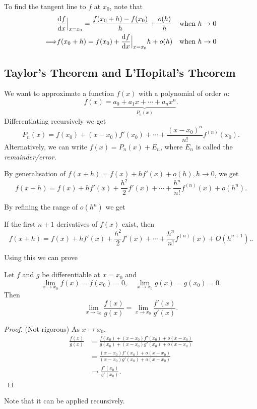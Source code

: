 \documentclass[10pt]{article}
\begin{document}
    To find the tangent line to $f$ at $x_0$, note that 
    \[
        \begin{aligned}
             & \frac{\mathrm{d}f}{\mathrm{d}x}\Big|_{x=x_0} = \frac{f(x_0+h)-f(x_0)}{h}+ \frac{o(h)}{h} & \text{when $ h \to 0$} \\
             \Longrightarrow & f(x_0+h) = f(x_0)+\frac{\mathrm{d}f}{\mathrm{d}x}\Big|_{x=x_0} h + o(h)& \text{when $ h \to 0$} \\
        \end{aligned}
    \]
    \subsection{Taylor's Theorem and L'Hopital's Theorem}
    We want to approximate a function $f(x)$ with a polynomial of order $n$:
    \[
        f(x) = \underbrace{a_0+a_1x+\cdots+a_nx^n}_{P_n(x)}
    .\]
    Differentiating recursively we get 
    \begin{equation}\label{eq:taylor_series}
        P_n(x) = f(x_0)+(x-x_0)f'(x_0)+\cdots+\frac{(x-x_0)^n}{n!}f^{(n)}(x_0).
    \end{equation}
    Alternatively, we can write $ f(x) = P_n(x)+E_n $, where $E_n$ is called the \textit{remainder/error}.

    By generalisation of $ f(x+h) = f(x) + hf'(x)+o(h), h\to 0 $, we get 
    \begin{equation}\label{eq:taylor_series_with_remainder}
        f(x+h) = f(x)+hf'(x)+\frac{h^2}{2}f'(x)+\cdots+\frac{h^n}{n!}f^{(n)}(x)+o(h^n).
    \end{equation}

    By refining the range of $o(h^n)$ we get
    \begin{theorem}[Taylor]\label{thm:taylor_theorem}
        If the first $n+1$ derivatives of $f(x)$ exist, then 
        \[
            f(x+h) = f(x)+hf'(x)+\frac{h^2}{2}f'(x)+\cdots+\frac{h^n}{n!}f^{(n)}(x)+O(h^{n+1}).
        .\]
    \end{theorem}

    Using this we can prove 
    \begin{theorem}[L'Hopital]\label{thm:L'Hopital}
        Let $f$ and $g$ be differentiable at $x=x_0$ and
        \[
            \lim_{x \to x_0} f(x)=f(x_0)=0, \quad \lim_{x \to x_0} g(x)=g(x_0)=0
        .\]
        Then 
        \[
            \lim_{x \to x_0} \frac{f(x)}{g(x)}=\lim_{x \to x_0} \frac{f'(x)}{g'(x)}.
        \]
    \end{theorem}
    \begin{proof}(Not rigorous)
        As $x\to x_0$, 
        \[
            \begin{aligned}
                 \frac{f(x)}{g(x)} &= \frac{f(x_0)+(x-x_0)f'(x_0)+o(x-x_0)}{g(x_0)+(x-x_0)g'(x_0)+o(x-x_0)}\\
                 &= \frac{(x-x_0)f'(x_0)+o(x-x_0)}{(x-x_0)g'(x_0)+o(x-x_0)}\\
                 &\to \frac{f'(x_0)}{g'(x_0)}.
            \end{aligned}
        \]
    \end{proof}
    Note that it can be applied recursively.
\end{document}
